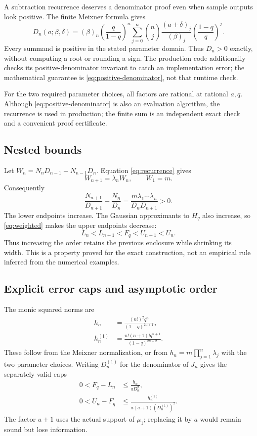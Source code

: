 \documentclass[11pt,a4paper]{article}
\theoremstyle{remark}\newtheorem{remark}[theorem]{Remark}
\begin{document}
A subtraction recurrence deserves a denominator proof even when sample outputs
look positive. The finite Meixner formula gives
\begin{equation}
 D_n(a;\beta,\delta)=
 (\beta)_n\left(\frac q{1-q}\right)^n
 \sum_{j=0}^{n}\binom nj
 \frac{(a+\delta)_j}{(\beta)_j}
 \left(\frac{1-q}{q}\right)^j.
 \label{eq:positive-denominator}
\end{equation}
Every summand is positive in the stated parameter domain. Thus $D_n>0$
exactly, without computing a root or rounding a sign. The production code
additionally checks its positive-denominator invariant to catch an implementation
error; the mathematical guarantee is \cref{eq:positive-denominator}, not that
runtime check.

For the two required parameter choices, all factors are rational at rational
$a,q$. Although \cref{eq:positive-denominator} is also an evaluation algorithm,
the recurrence is used in production; the finite sum is an independent exact
check and a convenient proof certificate.

\subsection{Nested bounds}

Let $W_n=N_nD_{n-1}-N_{n-1}D_n$. Equation \eqref{eq:recurrence} gives
\[
 W_{n+1}=\lambda_nW_n,\qquad W_1=m.
\]
Consequently
\begin{equation}
 \frac{N_{n+1}}{D_{n+1}}-\frac{N_n}{D_n}
 =\frac{m\lambda_1\cdots\lambda_n}{D_nD_{n+1}}>0.
 \label{eq:nesting}
\end{equation}
The lower endpoints increase. The Gaussian approximants to $H_q$ also increase,
so \cref{eq:weighted} makes the upper endpoints decrease:
\[
 L_n<L_{n+1}<F_q<U_{n+1}<U_n.
\]
Thus increasing the order retains the previous enclosure while shrinking its
width. This is a property proved for the exact construction, not an empirical
rule inferred from the numerical examples.

\subsection{Explicit error caps and asymptotic order}

The monic squared norms are
\begin{align}
 h_n&=\frac{(n!)^2q^n}{(1-q)^{2n+1}},\label{eq:norm0}\\
 h_n^{(1)}&=\frac{n!(n+1)!q^{n+1}}{(1-q)^{2n+2}}.
 \label{eq:norm1}
\end{align}
These follow from the Meixner normalization, or from $h_n=m\prod_{j=1}^n
\lambda_j$ with the two parameter choices.\cite{dlmfmeixner}
Writing $D_n^{(1)}$ for the denominator of $J_n$ gives the separately valid caps
\begin{align}
 0<F_q-L_n&\leq \frac{h_n}{aD_n^2},\label{eq:lower-cap}\\
 0<U_n-F_q&\leq
 \frac{h_n^{(1)}}{a(a+1)(D_n^{(1)})^2}.
 \label{eq:upper-cap}
\end{align}
The factor $a+1$ uses the actual support of $\mu_1$; replacing it by $a$
would remain sound but lose information.
\end{document}
